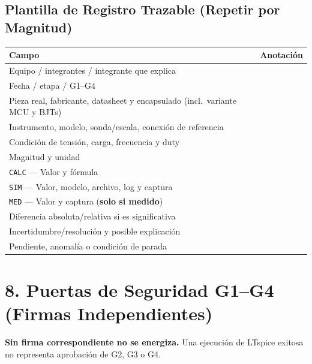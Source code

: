 \documentclass[10pt, a4paper, landscape]{article}
\begin{document}
\subsection*{Plantilla de Registro Trazable (Repetir por Magnitud)}
\par\vspace{0.08cm}\noindent
\renewcommand{\arraystretch}{1.28}
{\small
\begin{tabularx}{\linewidth}{|>{\raggedright\arraybackslash}p{7.8cm}|>{\raggedright\arraybackslash}X|}
\hline
\rowcolor{ucbgray}
\textbf{Campo} & \textbf{Anotación} \\ \hline
Equipo / integrantes / integrante que explica & \\ \hline
Fecha / etapa / G1--G4 & \\ \hline
Pieza real, fabricante, datasheet y encapsulado (incl.\ variante MCU y BJTs) & \\ \hline
Instrumento, modelo, sonda/escala, conexión de referencia & \\ \hline
Condición de tensión, carga, frecuencia y duty & \\ \hline
Magnitud y unidad & \\ \hline
\texttt{CALC} — Valor y fórmula & \\ \hline
\texttt{SIM} — Valor, modelo, archivo, log y captura & \\ \hline
\texttt{MED} — Valor y captura (\textbf{solo si medido}) & \\ \hline
Diferencia absoluta/relativa si es significativa & \\ \hline
Incertidumbre/resolución y posible explicación & \\ \hline
Pendiente, anomalía o condición de parada & \\ \hline
\end{tabularx}
}

\newpage
\section*{8. Puertas de Seguridad G1--G4 (Firmas Independientes)}
\textbf{\textcolor{warnred}{Sin firma correspondiente no se energiza.}} Una ejecución de LTspice exitosa no representa aprobación de G2, G3 o G4.
\end{document}
